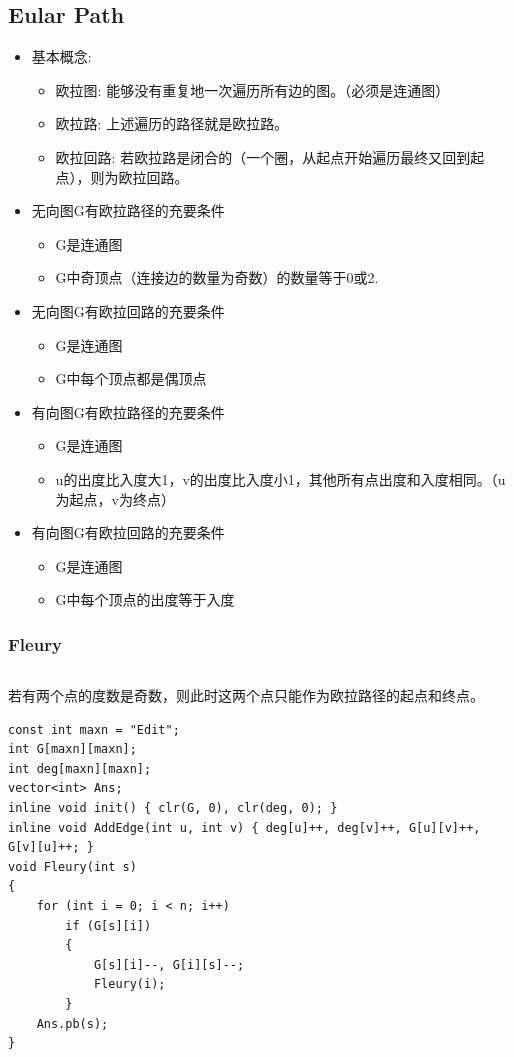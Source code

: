 \documentclass[twoside]{article}
\begin{document}
\subsection{Eular Path}
\begin{itemize}
\item  基本概念:
    \begin{itemize}
    \item 欧拉图: 能够没有重复地一次遍历所有边的图。（必须是连通图）
    \item 欧拉路: 上述遍历的路径就是欧拉路。
    \item 欧拉回路: 若欧拉路是闭合的（一个圈，从起点开始遍历最终又回到起点），则为欧拉回路。
    \end{itemize}
\item 无向图G有欧拉路径的充要条件
    \begin{itemize}
    \item G是连通图
    \item G中奇顶点（连接边的数量为奇数）的数量等于0或2.
    \end{itemize}
\item 无向图G有欧拉回路的充要条件
    \begin{itemize}
    \item G是连通图
    \item G中每个顶点都是偶顶点
    \end{itemize}
\item 有向图G有欧拉路径的充要条件
    \begin{itemize}
    \item G是连通图
    \item u的出度比入度大1，v的出度比入度小1，其他所有点出度和入度相同。（u为起点，v为终点）
    \end{itemize}
\item 有向图G有欧拉回路的充要条件
    \begin{itemize}
    \item G是连通图
    \item G中每个顶点的出度等于入度
    \end{itemize}
\end{itemize}
\subsubsection{Fleury}
\begin{lstlisting}
\end{lstlisting}
若有两个点的度数是奇数，则此时这两个点只能作为欧拉路径的起点和终点。
\begin{lstlisting}
const int maxn = "Edit";
int G[maxn][maxn];
int deg[maxn][maxn];
vector<int> Ans;
inline void init() { clr(G, 0), clr(deg, 0); }
inline void AddEdge(int u, int v) { deg[u]++, deg[v]++, G[u][v]++, G[v][u]++; }
void Fleury(int s)
{
    for (int i = 0; i < n; i++)
        if (G[s][i])
        {
            G[s][i]--, G[i][s]--;
            Fleury(i);
        }
    Ans.pb(s);
}
\end{lstlisting}
\end{document}
